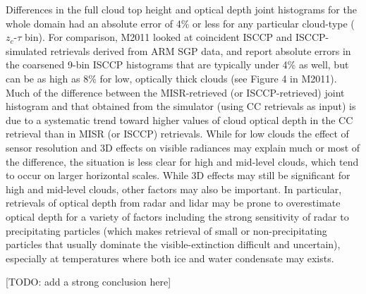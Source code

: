 Differences in the full cloud top height and optical depth joint histograms for the whole domain had an absolute error of 4\% or less for any particular cloud-type ($z_c$-$\tau$ bin). For comparison, M2011 looked at coincident ISCCP and ISCCP-simulated retrievals derived from ARM SGP data, and report absolute errors in the coarsened 9-bin ISCCP  histograms that are typically under 4\% as well, but can be as high as 8\% for low, optically thick clouds (see Figure 4 in M2011). Much of the difference between the MISR-retrieved (or ISCCP-retrieved) joint histogram and that obtained from the simulator (using CC retrievals as input) is due to a systematic trend toward higher values of cloud optical depth in the CC retrieval than in MISR (or ISCCP) retrievals. While for low clouds the effect of sensor resolution and 3D effects on visible radiances may explain much or most of the difference, the situation is less clear for high and mid-level clouds, which tend to occur on larger horizontal scales. While 3D effects may still be significant for high and mid-level clouds, other factors may also be important. In particular, retrievals of optical depth from radar and lidar may be prone to overestimate optical depth for a variety of factors including the strong sensitivity of radar to precipitating particles (which makes retrieval of small or non-precipitating particles that usually dominate the visible-extinction difficult and uncertain), especially at temperatures where both ice and water condensate may exists.

[TODO: add a strong conclusion here]
